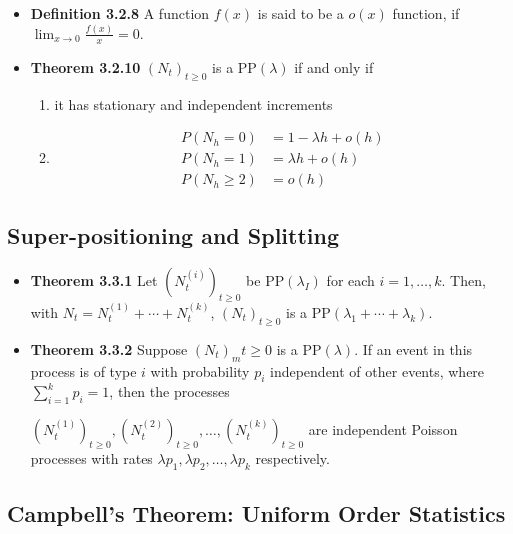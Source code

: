 \documentclass[11pt,a4paper]{article}
\begin{document}
\begin{itemize}
\begin{enumerate}
        \end{enumerate}
    \item \textbf{Definition 3.2.8}
        A function $f(x)$ is said to be a $o(x)$ function, if
        $\lim_{x \to 0} \frac{f(x)}{x} = 0$.
    \item \textbf{Theorem 3.2.10}
        ${(N_t)}_{t \geq 0}$ is a $\mathrm{PP}(\lambda)$ if and only if
        \begin{enumerate}
            \item it has stationary and independent increments
            \item
                \begin{align*}{}
                    P(N_h = 0)    & = 1 - \lambda h + o(h) \\
                    P(N_h = 1)    & = \lambda h + o(h) \\
                    P(N_h \geq 2) & = o(h)
                \end{align*}
        \end{enumerate}
\end{itemize}

\subsection{Super-positioning and Splitting}

\begin{itemize}
    \item \textbf{Theorem 3.3.1}
        Let ${(N_t^{(i)})}_{t\geq 0}$ be $\mathrm{PP}(\lambda _I)$ for each $i = 1, \ldots, k$.
        Then, with $N_t = N_t^{(1)} + \cdots + N_t^{(k)}$, ${(N_t)}_{t\geq 0}$ is a
        $\mathrm{PP}(\lambda_1 + \cdots + \lambda_k)$.

    \item \textbf{Theorem 3.3.2}
        Suppose ${(N_t)}_m{t \geq 0}$ is a $\mathrm{PP}(\lambda)$.
        If an event in this process is of type $i$ with probability $p_i$
        independent of other events, where $\sum_{i=1}^k p_i = 1$, then the processes

        ${(N_t^{(1)})}_{t\geq 0}, {(N_t^{(2)})}_{t \geq 0}, \ldots, {(N_t^{(k)})}_{t \geq 0}$
        are independent Poisson processes with rates $\lambda p_1, \lambda p_2, \ldots, \lambda p_k$
        respectively.

\end{itemize}

\subsection{Campbell's Theorem: Uniform Order Statistics}
\end{document}
